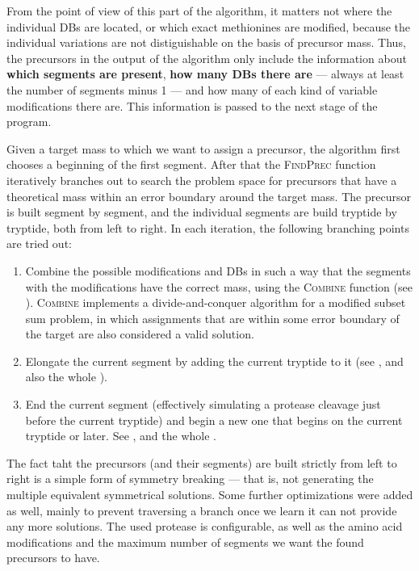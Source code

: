From the point of view of this part of the algorithm, it matters not where the individual DBs are located, or which exact methionines are modified, because the individual variations are not distiguishable on the basis of precursor mass. Thus, the precursors in the output of the algorithm only include the information about \textbf{which segments are present}, \textbf{how many DBs there are} --- always at least the number of segments minus 1 --- and how many of each kind of variable modifications there are. This information is passed to the next stage of the program.

Given a target mass to which we want to assign a precursor, the algorithm first chooses a beginning of the first segment. After that the \textsc{FindPrec} function iteratively branches out to search the problem space for precursors that have a theoretical mass within an error boundary around the target mass. The precursor is built segment by segment, and the individual segments are build tryptide by tryptide, both from left to right. In each iteration, the following branching points are tried out:

\begin{enumerate}
	\item Combine the possible modifications and DBs in such a way that the  segments with the modifications have the correct mass, using the \textsc{Combine} function (see ). \textsc{Combine} implements a divide-and-conquer algorithm for a modified subset sum problem, in which assignments that are within some error boundary of the target are also considered a valid solution.
	\item Elongate the current segment by adding the current tryptide to it (see , and also the whole ).
	\item End the current segment (effectively simulating a protease cleavage just before the current tryptide) and begin a new one that begins on the current tryptide or later. See , and the whole .
\end{enumerate}

The fact taht the precursors (and their segments) are built strictly from left to right is a simple form of symmetry breaking --- that is, not generating the multiple equivalent symmetrical solutions. Some further optimizations were added as well, mainly to prevent traversing a branch once we learn it can not provide any more solutions. The used protease is configurable, as well as the amino acid modifications and the maximum number of segments we want the found precursors to have.

